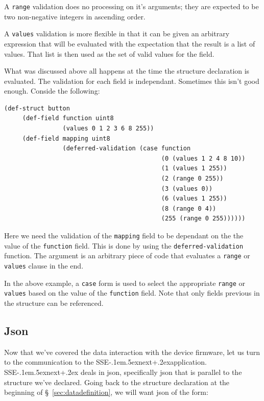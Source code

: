 \documentclass[12pt]{article}
\def\SSEnext{SSE\kern-.1em\lower.5ex\hbox{\footnotesize next}\kern+.2ex}
\begin{document}
A \verb|range| validation does no processing on it's arguments; they
are expected to be two non-negative integers in ascending order.

A \verb|values| validation is more flexible in that it can be given an
arbitrary expression that will be evaluated with the expectation that
the result is a list of values. That list is then used as the set of
valid values for the field.

What was discussed above all happens at the time the structure
declaration is evaluated. The validation for each field is
independant. Sometimes this isn't good enough. Conside the following:

\begin{verbatim}
(def-struct button
     (def-field function uint8
                (values 0 1 2 3 6 8 255))
     (def-field mapping uint8
                (deferred-validation (case function
                                           (0 (values 1 2 4 8 10))
                                           (1 (values 1 255))
                                           (2 (range 0 255))
                                           (3 (values 0))
                                           (6 (values 1 255))
                                           (8 (range 0 4))
                                           (255 (range 0 255))))))
\end{verbatim}

Here we need the validation of the \verb|mapping| field to be
dependant on the the value of the \verb|function| field. This is done
by using the \verb|deferred-validation| function. The argument is an
arbitrary piece of code that evaluates a \verb|range| or \verb|values|
clause in the end.

In the above example, a \verb|case| form is used to select the
appropriate \verb|range| or \verb|values| based on the value of the
\verb|function| field. Note that only fields previous in the structure
can be referenced.

\subsection{Json}

Now that we've covered the data interaction with the device firmware,
let us turn to the communication to the \SSEnext application. \SSEnext
deals in json, specifically json that is parallel to the structure we've
declared. Going back to the structure declaration at the beginning of
\S~\ref{sec:datadefinition}, we will want json of the form:
\end{document}
